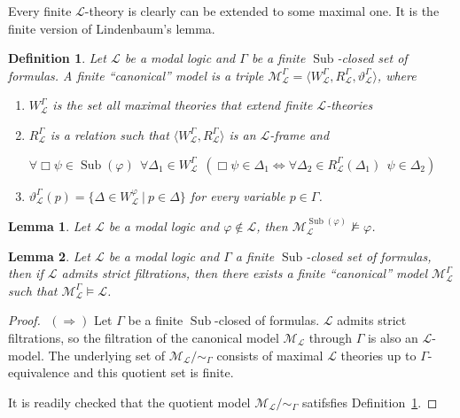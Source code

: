 \documentclass[a4paper]{article}
\theoremstyle{defin}
\newtheorem{defin}{Definition}
\theoremstyle{theorem}
\theoremstyle{prop}
\theoremstyle{lemma}
\newtheorem{lemma}{Lemma}
\theoremstyle{fact}
\theoremstyle{ex}
\theoremstyle{col}
\theoremstyle{claim}
\begin{document}
Every finite $\mathcal{L}$-theory is clearly can be extended to some maximal one. It is the finite version of Lindenbaum's lemma.

\begin{defin}\label{fin}
  Let $\mathcal{L}$ be a modal logic and $\Gamma$ be a finite $\operatorname{Sub}$-closed set of formulas. A finite ``canonical'' model is a triple $\mathcal{M}_{\mathcal{L}}^{\Gamma} = \langle W_{\mathcal{L}}^{\Gamma}, R_{\mathcal{L}}^{\Gamma}, \vartheta_{\mathcal{L}}^{\Gamma} \rangle$, where
  \begin{enumerate}
    \item $W_{\mathcal{L}}^{\Gamma}$ is the set all maximal theories that extend finite $\mathcal{L}$-theories
    \item $R_{\mathcal{L}}^{\Gamma}$ is a relation such that
    $\langle W_{\mathcal{L}}^{\Gamma}, R_{\mathcal{L}}^{\Gamma} \rangle$ is an $\mathcal{L}$-frame
    and
    \begin{center}
    $\forall \Box \psi \in \operatorname{Sub}(\varphi) \:\:
    \forall \Delta_1 \in W_{\mathcal{L}}^{\Gamma} \:\: (\Box \psi \in \Delta_1 \Leftrightarrow
    \forall \Delta_2 \in R_{\mathcal{L}}^{\Gamma}(\Delta_1) \:\: \psi \in \Delta_2)$
    \end{center}
    \item $\vartheta_{\mathcal{L}}^{\Gamma}(p) = \{ \Delta \in W_{\mathcal{L}}^{\varphi} \: | \: p \in \Delta \}$ for every variable $p \in \Gamma$.
  \end{enumerate}
\end{defin}

\begin{lemma}\label{good}
  Let $\mathcal{L}$ be a modal logic and $\varphi \not\in \mathcal{L}$, then $\mathcal{M}_{\mathcal{L}}^{\operatorname{Sub}(\varphi)} \nvDash \varphi$.
\end{lemma}

\begin{lemma} Let $\mathcal{L}$ be a modal logic and $\Gamma$ a finite $\operatorname{Sub}$-closed set of formulas, then if $\mathcal{L}$ admits strict filtrations, then there exists a finite ``canonical'' model $\mathcal{M}_{\mathcal{L}}^{\Gamma}$ such that $\mathcal{M}_{\mathcal{L}}^{\Gamma} \models \mathcal{L}$.
\end{lemma}

\begin{proof}
  $ $
$(\Rightarrow)$
  Let $\Gamma$ be a finite $\operatorname{Sub}$-closed of formulas. $\mathcal{L}$ admits strict filtrations, so the filtration of the canonical model $\mathcal{M}_{\mathcal{L}}$ through $\Gamma$ is also an $\mathcal{L}$-model. The underlying set of $\mathcal{M}_{\mathcal{L}} / \sim_{\Gamma}$ consists of maximal $\mathcal{L}$ theories up to $\Gamma$-equivalence and this quotient set is finite.

  It is readily checked that the quotient model $\mathcal{M}_{\mathcal{L}} / \sim_{\Gamma}$ satifsfies Definition~\ref{fin}.
\end{proof}
\end{document}
